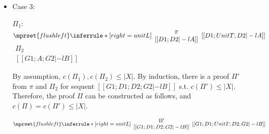 \begin{itemize}
\item Case 3:
      \begin{center}
        \scriptsize
        $\Pi_1$:
        \begin{math}
          $$\mprset{flushleft}
          \inferrule* [right={\tiny unitL}] {
            {
              \begin{array}{c}
                \pi \\
                {[[D1; D2 |-l A]]}
              \end{array}
            }
          }{[[D1; UnitT; D2 |-l A]]}
        \end{math}
        \qquad\qquad
        \begin{math}
          \begin{array}{c}
            \Pi_2 \\
            {[[G1; A; G2 |-l B]]}
          \end{array}
        \end{math}
      \end{center}
      By assumption, $c(\Pi_1),c(\Pi_2)\leq |X|$. By induction, there is a
      proof $\Pi'$ from $\pi$ and $\Pi_2$ for sequent
      $[[G1; D1; D2; G2 |-l B]]$
      s.t. $c(\Pi')\leq |X|$. Therefore, the proof $\Pi$ can be constructed
      as follows, and $c(\Pi)=c(\Pi')\leq |X|$.
      \begin{center}
        \scriptsize
        \begin{math}
          $$\mprset{flushleft}
          \inferrule* [right={\tiny unitL}] {
            {
              \begin{array}{c}
                \Pi' \\
                {[[G1; D1; D2; G2 |-l B]]}
              \end{array}
            }
          }{[[G1; D1; UnitT; D2; G2 |-l B]]}
        \end{math}
      \end{center}
\end{itemize}



